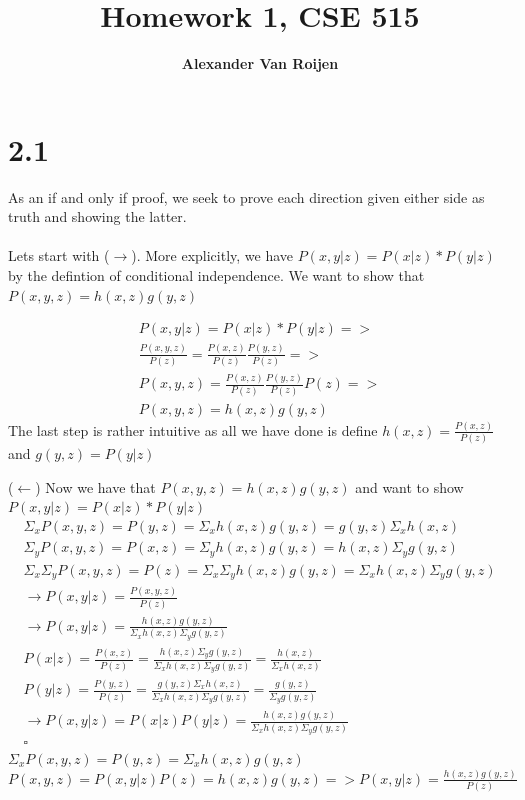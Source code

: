 \documentclass[12pt]{article}
\begin{document}
	
	\title{Homework 1, CSE 515}
	\author{\bf Alexander Van Roijen}
	
	\maketitle
	
	\section{2.1} As an if and only if proof, we seek to prove each direction given either side as truth and showing the latter. 
	\\
	\\
	Lets start with ($\rightarrow$). More explicitly, we have $P(x,y|z) = P(x|z)*P(y|z)$ by the defintion of conditional independence. We want to show that $P(x,y,z) = h(x,z)g(y,z)$
	
	\begin{gather}
		P(x,y|z) = P(x|z)*P(y|z) => \\
		\frac{P(x,y,z)}{P(z)} = \frac{P(x,z)}{P(z)}\frac{P(y,z)}{P(z)} => \\
		P(x,y,z) = \frac{P(x,z)}{P(z)}\frac{P(y,z)}{P(z)}P(z) => \\
		P(x,y,z) = h(x,z)g(y,z) 
	\end{gather}
	The last step is rather intuitive as all we have done is define $h(x,z) = \frac{P(x,z)}{P(z)}$ and $g(y,z) = P(y|z)$
	
	($\leftarrow$) Now we have that $P(x,y,z) = h(x,z)g(y,z)$ and want to show $P(x,y|z) = P(x|z)*P(y|z)$
	\begin{gather}
		\Sigma_{x} P(x,y,z) = P(y,z) = \Sigma_{x} h(x,z)g(y,z) = g(y,z)\Sigma_{x} h(x,z) \\
		\Sigma_{y} P(x,y,z) = P(x,z) = \Sigma_{y} h(x,z)g(y,z) = h(x,z)\Sigma_{y} g(y,z)\\
		\Sigma_{x}\Sigma_{y}  P(x,y,z) = P(z) = \Sigma_{x} \Sigma_{y} h(x,z)g(y,z) = \Sigma_{x}h(x,z)\Sigma_{y} g(y,z)\\
		\rightarrow P(x,y|z) = \frac{P(x,y,z)}{P(z)} \\
		\rightarrow P(x,y|z) = \frac{h(x,z)g(y,z)}{\Sigma_{x}h(x,z)\Sigma_{y} g(y,z)} \\
		 P(x|z) = \frac{P(x,z)}{P(z)} = \frac{h(x,z)\Sigma_{y} g(y,z)}{\Sigma_{x}h(x,z)\Sigma_{y} g(y,z)} = \frac{h(x,z)}{\Sigma_{x}h(x,z)} \\
		 P(y|z) = \frac{P(y,z)}{P(z)} = \frac{g(y,z)\Sigma_{x} h(x,z)}{\Sigma_{x}h(x,z)\Sigma_{y} g(y,z)} = \frac{g(y,z)}{\Sigma_{y} g(y,z)} \\
		 \rightarrow  P(x,y|z) = P(x|z)P(y|z) = \frac{h(x,z)g(y,z)}{\Sigma_{x}h(x,z)\Sigma_{y} g(y,z)}\\
		  \square
	\end{gather}
	$ \Sigma_{x} P(x,y,z) = P(y,z) = \Sigma_{x} h(x,z)g(y,z)$
	$P(x,y,z)=P(x,y|z)P(z) = h(x,z)g(y,z) => P(x,y|z) = \frac{h(x,z)g(y,z)}{P(z)}$
	
\end{document}
